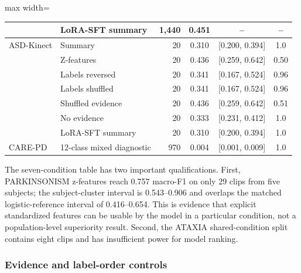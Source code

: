 \begin{table}[H]
\begin{adjustbox}{max width=\textwidth}
\begin{tabular}{llrccc}
& LoRA-SFT summary & 1,440 & 0.451 & -- & -- \\
\midrule
ASD-Kinect & Summary & 20 & 0.310 & [0.200, 0.394] & 1.0 \\
& Z-features & 20 & 0.436 & [0.259, 0.642] & 0.50 \\
& Labels reversed & 20 & 0.341 & [0.167, 0.524] & 0.96 \\
& Labels shuffled & 20 & 0.341 & [0.167, 0.524] & 0.96 \\
& Shuffled evidence & 20 & 0.436 & [0.259, 0.642] & 0.51 \\
& No evidence & 20 & 0.333 & [0.231, 0.412] & 1.0 \\
& LoRA-SFT summary & 20 & 0.310 & [0.200, 0.394] & 1.0 \\
\midrule
CARE-PD & 12-class mixed diagnostic & 970 & 0.004 & [0.001, 0.009] & 1.0 \\
\bottomrule
\end{tabular}
\end{adjustbox}
\end{table}

The seven-condition table has two important qualifications. First, PARKINSONISM z-features reach 0.757 macro-F1 on only 29 clips from five subjects; the subject-cluster interval is 0.543--0.906 and overlaps the matched logistic-reference interval of 0.416--0.654. This is evidence that explicit standardized features can be usable by the model in a particular condition, not a population-level superiority result. Second, the ATAXIA shared-condition split contains eight clips and has insufficient power for model ranking.

\subsubsection{Evidence and label-order controls}

